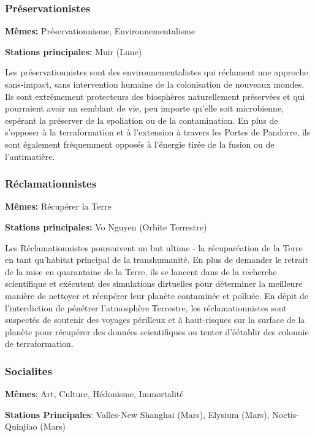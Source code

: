 \subsubsection{Préservationistes} \label{sec:preservationists} 

\textbf{Mêmes:} Préservationnisme, Environnementalisme 

\textbf{Stations principales:} Muir (Lune) 

Les préservationnistes sont des environnementalistes qui réclament une approche sans-impact, sans intervention humaine de la colonisation de nouveaux mondes. Ils sont extrêmement protecteurs des biosphères naturellement préservées et qui pourraient avoir un semblant de vie, peu importe qu'elle soit microbienne, espérant la préserver de la spoliation ou de la contamination. En plus de s'opposer à la terraformation et à l'extension à travers les Portes de Pandorre, ils sont également fréquemment opposés à l'énergie tirée de la fusion ou de l'antimatière. 

\subsubsection{Réclamationnistes} \label{sec:reclaimers} 

\textbf{Mêmes:} Récupérer la Terre 

\textbf{Stations principales:} Vo Nguyen (Orbite Terrestre) 

Les Réclamationnistes poursuivent un but ultime - la récuparéation de la Terre en tant qu'habitat principal de la transhumanité. En plus de demander le retrait de la mise en quarantaine de la Terre, ils se lancent dans de la recherche scientifique et exécutent des simulations dirtuelles pour déterminer la meilleure manière de nettoyer et récupérer leur planète contaminée et polluée. En dépit de l'interdiction de pénétrer l'atmosphère Terrestre, les réclamationnistes sont suspectés de soutenir des voyages périlleux et à haut-risques sur la surface de la planète pour récupérer des données scientifiques ou tenter d'éétablir des colonnie de terraformation. 

\subsubsection{Socialites} \label{sec:socialites} 

\textbf{Mêmes}: Art, Culture, Hédonisme, Immortalité 

\textbf{Stations Principales}: Valles-New Shanghai (Mars), Elysium (Mars), Noctis-Quinjiao (Mars) 


